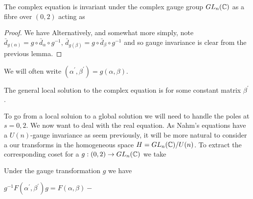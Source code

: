 \documentclass{article}
\begin{document}
\begin{lemma}
	The complex equation is invariant under the complex gauge group $GL_n(\mathbb{C})$ as a fibre over $(0,2)$ acting as 
\end{lemma}
\begin{proof}
	We have 
Alternatively, and somewhat more simply, note $\bar{d}_{g(\alpha)} = g \circ \bar{d}_\alpha \circ g^{-1}, \, \bar{d}_{g(\beta)} = g \circ \bar{d}_\beta \circ g^{-1}$ and so gauge invariance is clear from the previous lemma. 
\end{proof}

\begin{notation}
	We will often write $(\alpha^\prime, \beta^\prime) = g(\alpha,\beta)$. 
\end{notation}

\begin{prop}
	The general local solution to the complex equation is 
	for some constant matrix $\beta^\prime$. 
\end{prop}

To go from a local soluion to a global solution we will need to handle the poles at $s=0,2$. We now want to deal with the real equation. As Nahm's equations have a $U(n)$-gauge invariance as seem previously, it will be more natural to consider a our transforms in the homogeneous space $H = GL_n(\mathbb{C})/U(n)$. To extract the corresponding coset for a $g:(0,2) \to GL_n(\mathbb{C})$ we take 
\begin{lemma}
	Under the gauge transformation $g$ we have 
\end{lemma}
\begin{corollary}
	$g^{-1}F(\alpha^\prime,\beta^\prime) g = F(\alpha,\beta) - $
\end{corollary}
\end{document}
